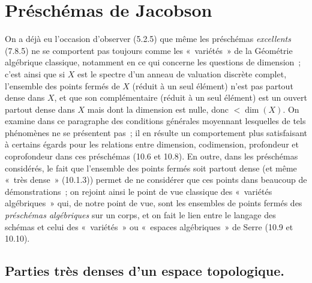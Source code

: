 \section{Préschémas de Jacobson}
\label{section:IV.10-fr}

On a déjà eu l'occasion d'observer (5.2.5) que même les préschémas
\emph{excellents} (7.8.5) ne se comportent pas toujours comme les
«~variétés~» de la Géométrie algébrique classique, notamment en ce qui
concerne les questions de dimension~; c'est ainsi que si $X$ est le spectre
d'un anneau de valuation discrète complet, l'ensemble des points fermés de
$X$ (réduit à un seul élément) n'est pas partout dense dans $X$, et que son
complémentaire (réduit à un seul élément) est un ouvert partout dense dans
$X$ mais dont la dimension est nulle, donc $<\dim(X)$. On examine dans ce
paragraphe des conditions générales moyennant lesquelles de tels phénomènes
ne se présentent pas~; il en résulte un comportement plus satisfaisant à
certains égards pour les relations entre dimension, codimension, profondeur
et coprofondeur dans ces préschémas (10.6 et 10.8). En outre, dans les
préschémas considérés, le fait que l'ensemble des points fermés soit partout
dense (et même «~très dense~» (10.1.3)) permet de ne considérer que ces points
dans beaucoup de démonstrations~; on rejoint ainsi le point de vue classique
des «~variétés algébriques~» qui, de notre point de vue, sont les ensembles
de points fermés des \emph{préschémas algébriques} sur un corps, et on fait le
lien entre le langage des schémas et celui des «~variétés~» ou «~espaces
algébriques~» de Serre (10.9 et 10.10).

\subsection{Parties très denses d'un espace topologique.}
\label{subsection:IV.10.1-fr}

